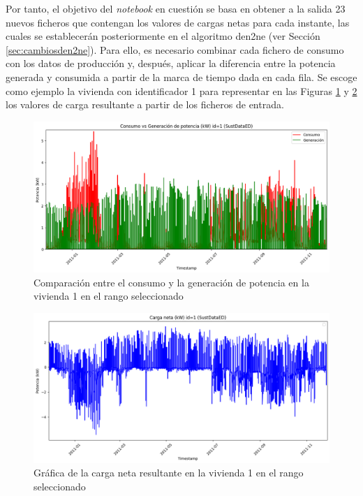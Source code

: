 Por tanto, el objetivo del \textit{notebook} en cuestión se basa en obtener a la salida 23 nuevos ficheros que contengan los valores de cargas netas para cada instante, las cuales se establecerán posteriormente en el algoritmo \gls{den2ne} (ver Sección \ref{sec:cambiosden2ne}). Para ello, es necesario combinar cada fichero de consumo con los datos de producción y, después, aplicar la diferencia entre la potencia generada y consumida a partir de la marca de tiempo dada en cada fila. Se escoge como ejemplo la vivienda con identificador 1 para representar en las Figuras \ref{fig:calculocarga} y \ref{fig:calculocarga2} los valores de carga resultante a partir de los ficheros de entrada.

\vspace{3mm}

\begin{figure}[H]
  \centering
  \includegraphics[width=1\textwidth]{img/diseno/calculocarga.png}
  \caption{Comparación entre el consumo y la generación de potencia en la vivienda 1 en el rango seleccionado}
  \label{fig:calculocarga}
\end{figure}

\begin{figure}[H]
  \centering
  \includegraphics[width=1\textwidth]{img/diseno/calculocarga2.png}
  \caption{Gráfica de la carga neta resultante en la vivienda 1 en el rango seleccionado}
  \label{fig:calculocarga2}
\end{figure}

